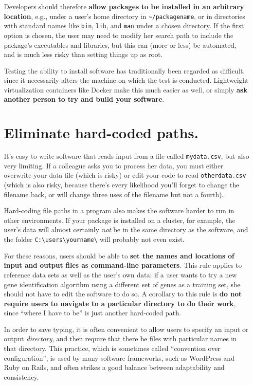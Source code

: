 \documentclass[10pt,letterpaper]{article}
\begin{document}
Developers should therefore
\textbf{allow packages to be installed in an arbitrary location},
e.g., under a user's home directory in
\texttt{\textasciitilde{}/packagename}, or in directories with standard
names like \texttt{bin}, \texttt{lib}, and \texttt{man} under a chosen
directory. If the first option is chosen, the user may need to modify
her search path to include the package's executables and libraries, but
this can (more or less) be automated, and is much less risky than
setting things up as root.

Testing the ability to install software has traditionally been regarded as difficult,
since it necessarily alters the machine on which the test is conducted.
Lightweight virtualization containers like Docker make this much easier as well, 
or simply \textbf{ask another person to try and build your software}.

\section{Eliminate hard-coded paths.}

It's easy to write software that reads input from a file called
\texttt{mydata.csv}, but also very limiting. If a colleague asks you to
process her data, you must either overwrite your data file (which is
risky) or edit your code to read \texttt{otherdata.csv} (which is also
risky, because there's every likelihood you'll forget to change the
filename back, or will change three uses of the filename but not a
fourth).

Hard-coding file paths in a program also makes the software harder to run
in other environments. If your package is installed on a cluster, for
example, the user's data will almost certainly \emph{not} be in the same
directory as the software, and the folder
\texttt{C:\textbackslash{}users\textbackslash{}yourname\textbackslash{}}
will probably not even exist.

For these reasons, users should be able to
\textbf{set the names and locations of input and output files as command-line parameters}.
This rule applies to reference data sets as well as the user's own
data: if a user wants to try a new gene identification algorithm using
a different set of genes as a training set, she should not have to
edit the software to do so.
A corollary to this rule is
\textbf{do not require users to navigate to a particular directory to do their work},
since ``where I have to be'' is just another hard-coded path.

In order to save typing, it is often convenient to allow users to
specify an input or output \emph{directory}, and then require that there
be files with particular names in that directory. This practice, which
is sometimes called ``convention over configuration'', is used by many
software frameworks, such as WordPress and Ruby on Rails, and often
strikes a good balance between adaptability and consistency.
\end{document}
